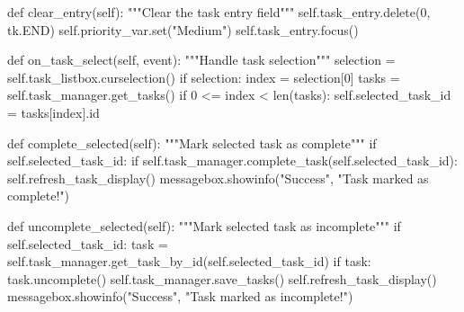 \documentclass[
  letterpaper,
  DIV=11,
  numbers=noendperiod,
  oneside]{scrreprt}
\newenvironment{Shaded}{}{}
\newcommand{\BuiltInTok}[1]{\textcolor[rgb]{0.84,0.23,0.29}{#1}}
\newcommand{\CommentTok}[1]{\textcolor[rgb]{0.42,0.45,0.49}{#1}}
\newcommand{\ControlFlowTok}[1]{\textcolor[rgb]{0.84,0.23,0.29}{#1}}
\newcommand{\DecValTok}[1]{\textcolor[rgb]{0.00,0.36,0.77}{#1}}
\newcommand{\KeywordTok}[1]{\textcolor[rgb]{0.84,0.23,0.29}{#1}}
\newcommand{\NormalTok}[1]{\textcolor[rgb]{0.14,0.16,0.18}{#1}}
\newcommand{\OperatorTok}[1]{\textcolor[rgb]{0.14,0.16,0.18}{#1}}
\newcommand{\StringTok}[1]{\textcolor[rgb]{0.01,0.18,0.38}{#1}}
\newcommand{\VariableTok}[1]{\textcolor[rgb]{0.89,0.38,0.04}{#1}}
\begin{document}
\begin{Shaded}
\begin{Highlighting}[]
    \KeywordTok{def}\NormalTok{ clear\_entry(}\VariableTok{self}\NormalTok{):}
        \CommentTok{"""Clear the task entry field"""}
        \VariableTok{self}\NormalTok{.task\_entry.delete(}\DecValTok{0}\NormalTok{, tk.END)}
        \VariableTok{self}\NormalTok{.priority\_var.}\BuiltInTok{set}\NormalTok{(}\StringTok{"Medium"}\NormalTok{)}
        \VariableTok{self}\NormalTok{.task\_entry.focus()}
    
    \KeywordTok{def}\NormalTok{ on\_task\_select(}\VariableTok{self}\NormalTok{, event):}
        \CommentTok{"""Handle task selection"""}
\NormalTok{        selection }\OperatorTok{=} \VariableTok{self}\NormalTok{.task\_listbox.curselection()}
        \ControlFlowTok{if}\NormalTok{ selection:}
\NormalTok{            index }\OperatorTok{=}\NormalTok{ selection[}\DecValTok{0}\NormalTok{]}
\NormalTok{            tasks }\OperatorTok{=} \VariableTok{self}\NormalTok{.task\_manager.get\_tasks()}
            \ControlFlowTok{if} \DecValTok{0} \OperatorTok{\textless{}=}\NormalTok{ index }\OperatorTok{\textless{}} \BuiltInTok{len}\NormalTok{(tasks):}
                \VariableTok{self}\NormalTok{.selected\_task\_id }\OperatorTok{=}\NormalTok{ tasks[index].}\BuiltInTok{id}
    
    \KeywordTok{def}\NormalTok{ complete\_selected(}\VariableTok{self}\NormalTok{):}
        \CommentTok{"""Mark selected task as complete"""}
        \ControlFlowTok{if} \VariableTok{self}\NormalTok{.selected\_task\_id:}
            \ControlFlowTok{if} \VariableTok{self}\NormalTok{.task\_manager.complete\_task(}\VariableTok{self}\NormalTok{.selected\_task\_id):}
                \VariableTok{self}\NormalTok{.refresh\_task\_display()}
\NormalTok{                messagebox.showinfo(}\StringTok{"Success"}\NormalTok{, }\StringTok{"Task marked as complete!"}\NormalTok{)}
    
    \KeywordTok{def}\NormalTok{ uncomplete\_selected(}\VariableTok{self}\NormalTok{):}
        \CommentTok{"""Mark selected task as incomplete"""}
        \ControlFlowTok{if} \VariableTok{self}\NormalTok{.selected\_task\_id:}
\NormalTok{            task }\OperatorTok{=} \VariableTok{self}\NormalTok{.task\_manager.get\_task\_by\_id(}\VariableTok{self}\NormalTok{.selected\_task\_id)}
            \ControlFlowTok{if}\NormalTok{ task:}
\NormalTok{                task.uncomplete()}
                \VariableTok{self}\NormalTok{.task\_manager.save\_tasks()}
                \VariableTok{self}\NormalTok{.refresh\_task\_display()}
\NormalTok{                messagebox.showinfo(}\StringTok{"Success"}\NormalTok{, }\StringTok{"Task marked as incomplete!"}\NormalTok{)}
    

\end{Highlighting}
\end{Shaded}
\end{document}

